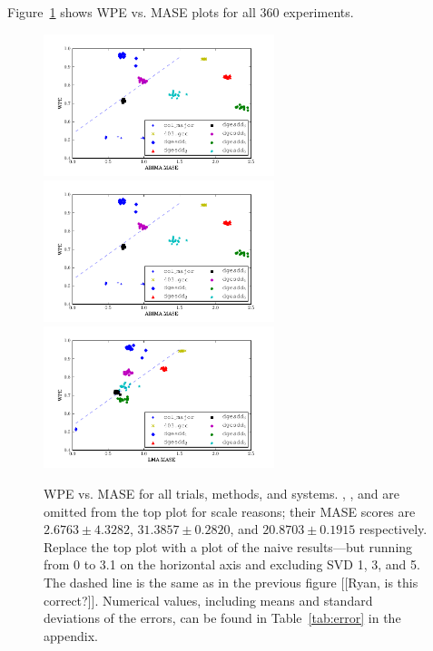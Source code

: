 Figure~\ref{fig:wpe_vs_mase_all} shows WPE vs. MASE plots for all 360
experiments.
\begin{figure}
  \centering
    \includegraphics[width=0.6\textwidth]{figs/ARIMA_prediction_vs_entropy}
    \includegraphics[width=0.6\textwidth]{figs/ARIMA_prediction_vs_entropy}
    \includegraphics[width=0.6\textwidth]{figs/LMA_prediction_vs_entropy}
\caption{WPE vs. MASE for all trials, methods, and systems.  \svdone,
  \svdthree, and \svdfive are omitted from the top plot for scale
  reasons; their MASE scores are $2.6763\pm4.3282$, $31.3857\pm
  0.2820$, and $20.8703 \pm 0.1915$ respectively.  {\color{red}Replace
    the top plot with a plot of the naive results---but running from 0
    to 3.1 on the horizontal axis and excluding SVD 1, 3, and 5}.  The
  dashed line is the same as in the previous figure [[Ryan, is this
      correct?]].  Numerical values, including means and standard
  deviations of the errors, can be found in Table~\ref{tab:error} in
  the appendix.
% 
% 
}
    \label{fig:wpe_vs_mase_all}
\end{figure} 
